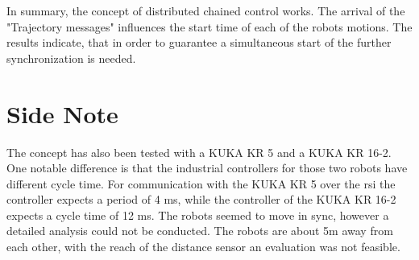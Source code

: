 In summary, the concept of distributed chained control works. The arrival of the "Trajectory messages" influences the start time of each of the robots motions. The results indicate, that in order to guarantee a simultaneous start of the further synchronization is needed. 

\section*{Side Note}
The concept has also been tested with a KUKA KR 5 and a KUKA KR 16-2. One notable difference is that the industrial controllers for those two robots have different cycle time. For communication with the KUKA KR 5 over the \gls{rsi} the controller expects a period of 4 \si{\milli\second}, while the controller of the KUKA KR 16-2 expects a cycle time of 12 \si{\milli\second}. The robots seemed to move in sync, however a detailed analysis could not be conducted. The robots are about 5m away from each other, with the reach of the distance sensor an evaluation was not feasible. 
